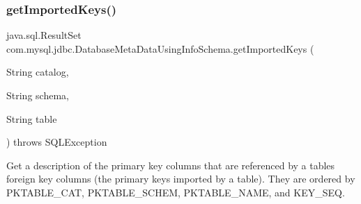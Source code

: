 \subsubsection{\texorpdfstring{get\+Imported\+Keys()}{getImportedKeys()}}
{\footnotesize\ttfamily java.\+sql.\+Result\+Set com.\+mysql.\+jdbc.\+Database\+Meta\+Data\+Using\+Info\+Schema.\+get\+Imported\+Keys (\begin{DoxyParamCaption}\item[{String}]{catalog,  }\item[{String}]{schema,  }\item[{String}]{table }\end{DoxyParamCaption}) throws S\+Q\+L\+Exception}

Get a description of the primary key columns that are referenced by a table\textquotesingle{}s foreign key columns (the primary keys imported by a table). They are ordered by P\+K\+T\+A\+B\+L\+E\+\_\+\+C\+AT, P\+K\+T\+A\+B\+L\+E\+\_\+\+S\+C\+H\+EM, P\+K\+T\+A\+B\+L\+E\+\_\+\+N\+A\+ME, and K\+E\+Y\+\_\+\+S\+EQ. 

